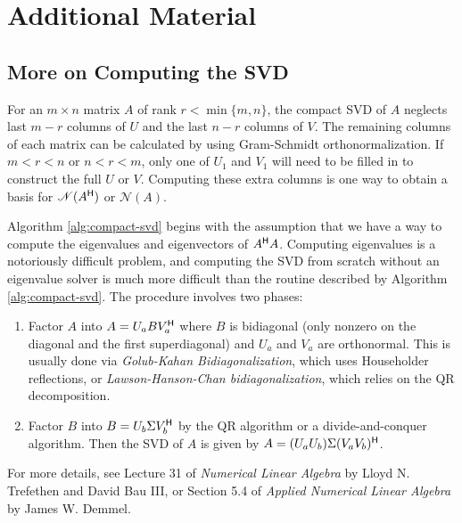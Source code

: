 
\newpage

\section*{Additional Material} %

\subsection*{More on Computing the SVD} %

For an $m\times n$ matrix $A$ of rank $r < \min\{m,n\}$, the compact SVD of $A$ neglects last $m-r$ columns of $U$ and the last $n-r$ columns of $V$.
The remaining columns of each matrix can be calculated by using Gram-Schmidt orthonormalization.
If $m < r < n$ or $n < r < m$, only one of $U_1$ and $V_1$ will need to be filled in to construct the full $U$ or $V$.
Computing these extra columns is one way to obtain a basis for $\mathscr{N}(A^{\mathsf H})$ or $\mathscr{N}(A)$.

Algorithm \ref{alg:compact-svd} begins with the assumption that we have a way to compute the eigenvalues and eigenvectors of $A^{\mathsf H} A$.
Computing eigenvalues is a notoriously difficult problem, and computing the SVD from scratch without an eigenvalue solver is much more difficult than the routine described by Algorithm \ref{alg:compact-svd}.
The procedure involves two phases:
\begin{enumerate}
    \item Factor $A$ into $A = U_a B V^{\mathsf H}_a$ where $B$ is bidiagonal (only nonzero on the diagonal and the first superdiagonal) and $U_a$ and $V_a$ are orthonormal.
    This is usually done via \emph{Golub-Kahan Bidiagonalization}, which uses Householder reflections, or \emph{Lawson-Hanson-Chan bidiagonalization}, which relies on the QR decomposition.
    \item Factor $B$ into $B = U_b \Sigma V^{\mathsf H}_b$ by the QR algorithm or a divide-and-conquer algorithm.
    Then the SVD of $A$ is given by $A = (U_aU_b)\Sigma (V_aV_b)^{\mathsf H}$.
\end{enumerate}
For more details, see Lecture 31 of \emph{Numerical Linear Algebra} by Lloyd N. Trefethen and David Bau III, or Section 5.4 of \emph{Applied Numerical Linear Algebra} by James W. Demmel.

